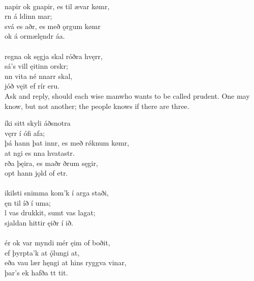 \\

\bva {}napir ok gnapir, \hld es til ævar kømr, \\%
\ind {}rn á ldinn mar; \\%
svá es aðr, \hld es með ǫrgum kømr \\%
\ind ok á ormælęndr áa.\\%

 \\

\bva {}regna ok sęgja \hld skal róðra hvęrr, \\%
\ind sá's vill ęitinn orskr; \\%
nn vita \hld né nnarr skal, \\%
\ind {}jóð vęit ef rír eru.\\%

\bvb Ask and reply, should each wise man\footnotemark[70] who wants to be called prudent. One may know, but not another; the people knows if there are three. \\

\bva {}íki sitt \hld skyli áðsnotra \\%
\ind {}vęrr í ófi afa; \\%
þá hann þat innr, \hld es með rǿknum kømr, \\%
\ind at ngi es nna hvatastr. \\%
rða þęira, \hld es maðr ðrum sęgir, \\%
\ind opt hann jǫld of etr.\\%

 \\

\bva {}ikilsti snimma \hld kom'k í arga staði, \\%
\ind ęn til íð í uma; \\%
l vas drukkit, \hld sumt vas lagat; \\%
\ind sjaldan hittir ęiðr í ið.\\%

 \\

\bva {}ér ok var \hld myndi mér ęim of boðit, \\%
\ind ef þyrpta'k at ǫ́lungi at, \\%
eða vau lær hęngi \hld at hins ryggva vinar, \\%
\ind þar's ek hafða tt tit.\\%

